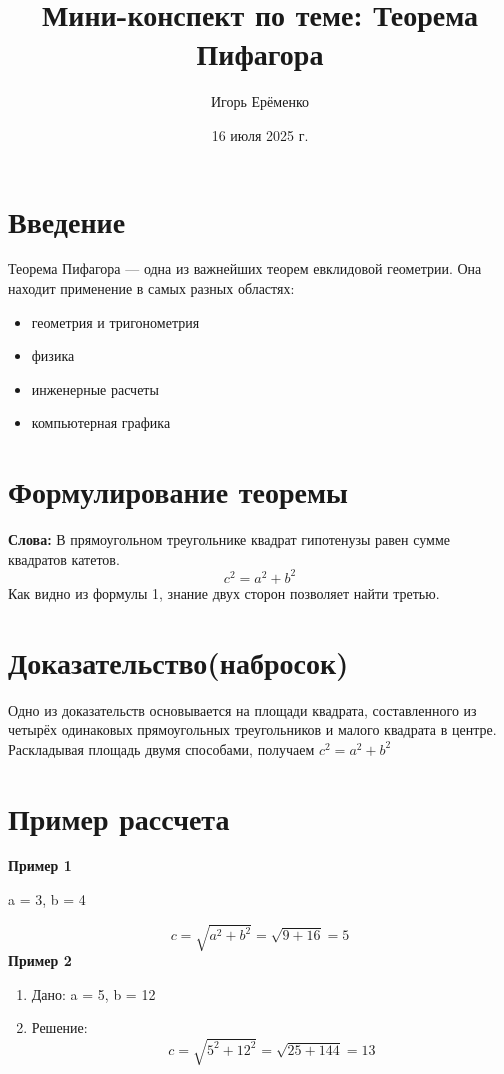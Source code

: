 \documentclass{article}
\title{Мини-конспект по теме: Теорема Пифагора}
\author{Игорь Ерёменко}
\date{16 июля 2025 г.}
\begin{document}
\maketitle
\tableofcontents
\newpage
\section{Введение}
{Теорема Пифагора — одна из важнейших теорем евклидовой геометрии. Она находит
применение в самых разных областях:}
\begin{itemize}
    \item геометрия и тригонометрия
    \item физика
    \item инженерные расчеты
    \item компьютерная графика
\end{itemize}
\section{Формулирование теоремы}
\textbf{Слова:}
{В прямоугольном треугольнике квадрат гипотенузы равен сумме квадратов
катетов.}
\newline
\begin{equation}
c^2 = a^2 + b^2
\end{equation}
\newline
\hspace{8mm} 
Как видно из формулы 1, знание двух сторон позволяет найти третью.
\section{Доказательство(набросок)}
\begin{center}
Одно из доказательств основывается на площади квадрата, составленного
из четырёх одинаковых прямоугольных треугольников и малого квадрата
в центре. Раскладывая площадь двумя способами, получаем $c^2 = a^2 + b^2$

\end{center}
\section{Пример рассчета}
\textbf{Пример 1}
\begin{center}
a = 3, b = 4
\end{center}
\begin{equation}
c = \sqrt{a^2 + b^2} = \sqrt {9+ 16} = 5
\end{equation}
\textbf{Пример 2}
\begin{enumerate}
    \item Дано:
    {a = 5, b = 12}
    \item Решение:
    \begin{equation}
c = \sqrt{5^2 + 12^2} = \sqrt {25+ 144} = 13
\end{equation}
\end{enumerate}
\end{document}
